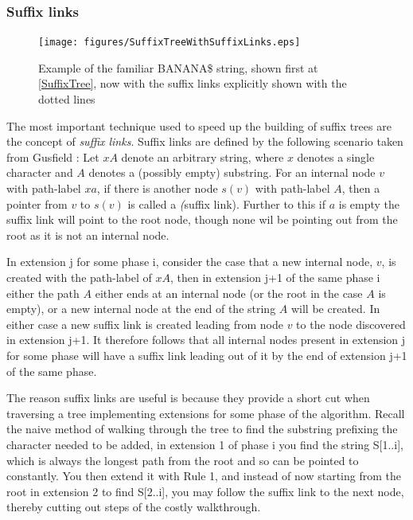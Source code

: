 \documentclass[12pt,twoside,notitlepage]{report}
\begin{document}
					\subsubsection{Suffix links}

\begin{figure}[h]
			\centerline{\texttt{[image: figures/SuffixTreeWithSuffixLinks.eps]}}
			\caption{\label{fig:SuffixLinks} Example of the familiar BANANA\$ string, shown first at \ref{SuffixTree}, now with the suffix links explicitly shown with the dotted lines}
\end{figure}					
					
					The most important technique used to speed up the building of suffix trees are the concept of \emph{suffix links}. Suffix links are defined by the following scenario taken from Gusfield \cite{Gusfield1997}: Let $xA$ denote an arbitrary string, where $x$ denotes a single character and $A$ denotes a (possibly empty) substring. For an internal node $v$ with path-label $xa$, if there is another node $s(v)$ with path-label $A$, then a pointer from $v$ to $s(v)$ is called a \emph(suffix link). Further to this if $a$ is empty the suffix link will point to the root node, though none wil be pointing out from the root as it is not an internal node. 
					
					In extension j for some phase i, consider the case that a new internal node, $v$, is created with the path-label of $xA$, then in extension j+1 of the same phase i either the path $A$ either ends at an internal node (or the root in the case $A$ is empty), or a new internal node at the end of the string $A$ will be created. In either case a new suffix link is created leading from node $v$ to the node discovered in extension j+1. It therefore follows that all internal nodes present in extension j for some phase will have a suffix link leading out of it by the end of extension j+1 of the same phase.
					
					The reason suffix links are useful is because they provide a short cut when traversing a tree implementing extensions for some phase of the algorithm. Recall the naive method of walking through the tree to find the substring prefixing the character needed to be added, in extension 1 of phase i you find the string S[1..i], which is always the longest path from the root and so can be pointed to constantly. You then extend it with Rule 1, and instead of now starting from the root in extension 2 to find S[2..i], you may follow the suffix link to the next node, thereby cutting out steps of the costly walkthrough.
					
\end{document}
